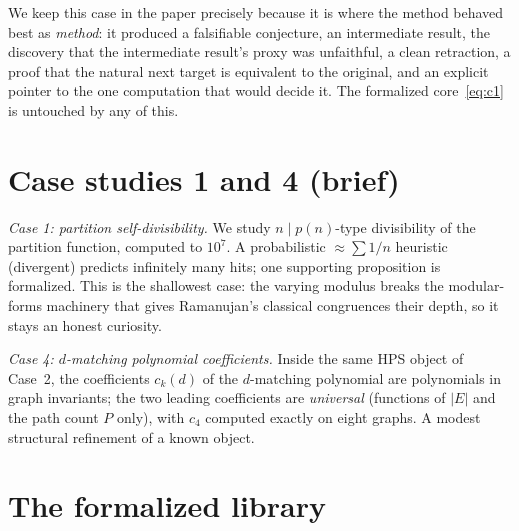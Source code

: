 \documentclass[11pt]{article}
\theoremstyle{remark}\newtheorem{remark}[theorem]{Remark}
\begin{document}
We keep this case in the paper precisely because it is where the method behaved
best as \emph{method}: it produced a falsifiable conjecture, an intermediate
result, the discovery that the intermediate result's proxy was unfaithful, a clean
retraction, a proof that the natural next target is equivalent to the original, and
an explicit pointer to the one computation that would decide it. The formalized
core~\eqref{eq:c1} is untouched by any of this.

\section{Case studies 1 and 4 (brief)}

\emph{Case 1: partition self-divisibility.} We study $n\mid p(n)$-type divisibility
of the partition function, computed to $10^7$. A probabilistic
$\approx\sum 1/n$ heuristic (divergent) predicts infinitely many hits; one
supporting proposition is formalized. This is the shallowest case: the varying
modulus breaks the modular-forms machinery that gives Ramanujan's classical
congruences their depth, so it stays an honest curiosity.

\emph{Case 4: $d$-matching polynomial coefficients.} Inside the same HPS object of
Case~2, the coefficients $c_k(d)$ of the $d$-matching polynomial are
polynomials in graph invariants; the two leading coefficients are \emph{universal}
(functions of $|E|$ and the path count $P$ only), with $c_4$ computed exactly on
eight graphs. A modest structural refinement of a known object.

\section{The formalized library}\label{sec:mathlib}
\end{document}
